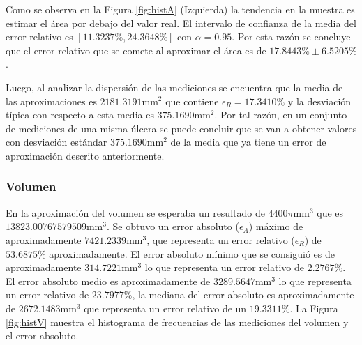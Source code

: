 Como se observa en la Figura \ref{fig:histA} (Izquierda) la tendencia en la muestra es estimar el área por debajo del valor real. El intervalo de confianza de la media del error relativo es $[11.3237\%, 24.3648\%]$ con $\alpha =0.95$. Por esta razón se concluye que el error relativo que se comete al aproximar el área es de $17.8443\% \pm 6.5205\%$. 

Luego, al analizar la dispersión de las mediciones se encuentra que la media de las aproximaciones es $2181.3191\text{mm}^2$ que contiene $\epsilon_R=17.3410\%$ y la desviación típica con respecto a esta media es $375.1690\text{mm}^2$. Por tal razón, en un conjunto de mediciones de una misma úlcera se puede concluir que se van a obtener valores con desviación estándar $375.1690\text{mm}^2$ de la media que ya tiene un error de aproximación descrito anteriormente.

\subsubsection{Volumen}

En la aproximación del volumen se esperaba un resultado de $4400\pi\text{mm}^3$ que es $13823.00767579509\text{mm}^3$. Se obtuvo un error absoluto ($\epsilon_A$) máximo de aproximadamente $7421.2339\text{mm}^3$, que representa un error relativo ($\epsilon_R$) de $53.6875\%$ aproximadamente. El error absoluto mínimo que se consiguió es de aproximadamente $314.7221\text{mm}^3$ lo que representa un error relativo de $2.2767\%$. El error absoluto medio es aproximadamente de $3289.5647\text{mm}^3$ lo que representa un error relativo de $23.7977\%$, la mediana del error absoluto es aproximadamente de $2672.1483\text{mm}^3$ que representa un error relativo de un $19.3311\%$. La Figura \ref{fig:histV} muestra el histograma de frecuencias de las mediciones del volumen y el error absoluto.

